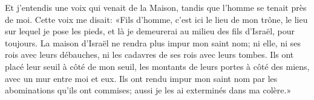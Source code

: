 Et j’entendis une voix qui venait de la Maison, tandis que l’homme se tenait près de moi.
Cette voix me disait: «Fils d’homme, c’est ici le lieu de mon trône,
	le lieu sur lequel je pose les pieds,
	et là je demeurerai au milieu des fils d’Israël, pour toujours.
La maison d’Israël ne rendra plus impur mon saint nom;
	ni elle, ni ses rois avec leurs débauches,
	ni les cadavres de ses rois avec leurs tombes.
Ils ont placé leur seuil à côté de mon seuil,
	les montants de leurs portes à côté des miens, avec un mur entre moi et eux.
Ils ont rendu impur mon saint nom par les abominations qu’ils ont commises;
	aussi je les ai exterminés dans ma colère.»
